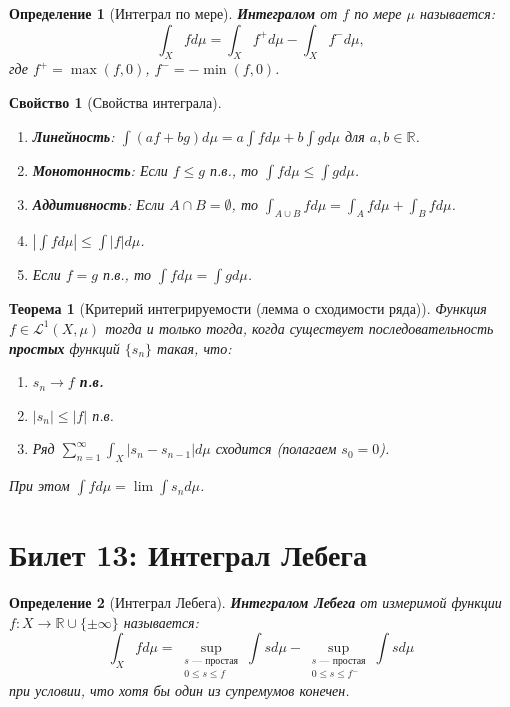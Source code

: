 \documentclass[a4paper, 12pt]{article}
\newtheorem{definition}{Определение}
\newtheorem{theorem}{Теорема}
\newtheorem{property}{Свойство}
\newcommand{\R}{\mathbb{R}}
\newcommand{\1}{\mathbf{1}}
\begin{document}
\begin{definition}[Интеграл по мере]
    \textbf{Интегралом} от $f$ по мере $\mu$ называется:
    \[
    \int_X f  d\mu = \int_X f^+  d\mu - \int_X f^-  d\mu,
    \]
    где $f^+ = \max(f, 0)$, $f^- = -\min(f, 0)$.
\end{definition}

\begin{property}[Свойства интеграла]
    \hfill
    \begin{enumerate}[label=(\arabic*)]
        \item \textbf{Линейность}: $\int (af + bg)  d\mu = a\int f  d\mu + b\int g  d\mu$ для $a,b \in \R$.
        \item \textbf{Монотонность}: Если $f \leq g$ п.в., то $\int f  d\mu \leq \int g  d\mu$.
        \item \textbf{Аддитивность}: Если $A \cap B = \emptyset$, то $\int_{A \cup B} f  d\mu = \int_A f  d\mu + \int_B f  d\mu$.
        \item $|\int f  d\mu| \leq \int |f|  d\mu$.
        \item Если $f = g$ п.в., то $\int f  d\mu = \int g  d\mu$.
    \end{enumerate}
\end{property}

\begin{theorem}[Критерий интегрируемости (лемма о сходимости ряда)]
    Функция $f \in \mathcal{L}^1(X, \mu)$ тогда и только тогда, когда существует последовательность \textbf{простых} функций $\{s_n\}$ такая, что:
    \begin{enumerate}[label=(\roman*)]
        \item $s_n \to f$ \textbf{п.в.}
        \item $|s_n| \leq |f|$ п.в.
        \item Ряд $\sum_{n=1}^{\infty} \int_X |s_n - s_{n-1}|  d\mu$ сходится (полагаем $s_0 = 0$).
    \end{enumerate}
    При этом $\int f  d\mu = \lim \int s_n  d\mu$.
\end{theorem}

\section*{Билет 13: Интеграл Лебега}
\begin{definition}[Интеграл Лебега]
    \textbf{Интегралом Лебега} от измеримой функции $f: X \to \R \cup \{\pm\infty\}$ называется:
    \[
    \int_X f  d\mu = \sup_{\substack{s \text{ — простая} \\ 0 \leq s \leq f}} \int s  d\mu - \sup_{\substack{s \text{ — простая} \\ 0 \leq s \leq f^-}} \int s  d\mu
    \]
    при условии, что хотя бы один из супремумов конечен.
\end{definition}
\end{document}
